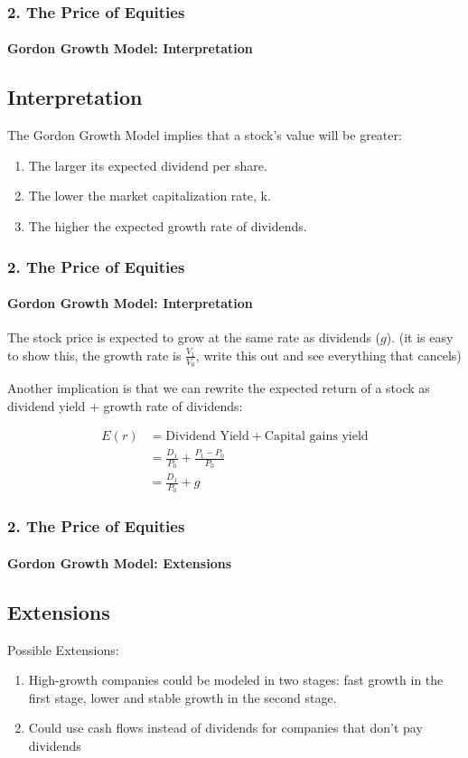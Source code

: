 \documentclass{beamer}
\begin{document}
\begin{frame}[t]
    \frametitle{2. The Price of Equities}
    \framesubtitle{Gordon Growth Model: Interpretation}
    \subsection{Interpretation}

    The Gordon Growth Model implies that a stock’s value will be greater:
    \begin{enumerate}
        \item The larger its expected dividend per share.
        \item The lower the market capitalization rate, k.
        \item The higher the expected growth rate of dividends.
    \end{enumerate}

\end{frame}

\begin{frame}[t]
    \frametitle{2. The Price of Equities}
    \framesubtitle{Gordon Growth Model: Interpretation}

    The stock price is expected to grow at the same rate as dividends ($g$).   (it is easy to show this, the growth rate is $\frac{V_1}{V_0}$, write this out and see everything that cancels)
    \vspace{1em}
    
    Another implication is that we can rewrite the expected return of a stock as dividend yield + growth rate of dividends:
    
    \begin{align*}
    E(r) &= \text{Dividend Yield} + \text{Capital gains yield} \\
    &= \frac{D_1}{P_0} + \frac{P_1 - P_0}{P_0} \\
    &= \frac{D_1}{P_0} + g
    \end{align*}
    
\end{frame}

\begin{frame}[t]
    \frametitle{2. The Price of Equities}
    \framesubtitle{Gordon Growth Model: Extensions}
    \subsection{Extensions}

    Possible Extensions:
    \begin{enumerate}
        \item High-growth companies could be modeled in two stages: fast growth in the first stage, lower and stable growth in the second stage.
        \item Could use cash flows instead of dividends for companies that don’t pay dividends
    \end{enumerate}
    
\end{frame}
\end{document}
